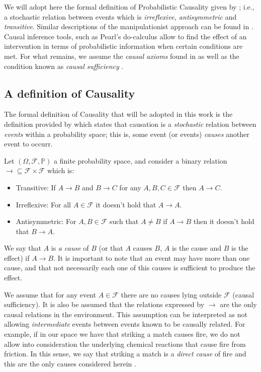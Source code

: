 \documentclass{svjour3}                     %
\begin{document}
We will adopt here the formal definition of Probabilistic Causality given by \cite{spirtes2000causation}; i.e., a stochastic relation between events which is \textit{irreflexive, antisymmetric} and \textit{transitive}. Similar descriptions of the manipulationist approach can be found in \cite{holland1986statistics}. Causal inference tools, such as Pearl's do-calculus \citep{pearl2009causality} allow to find the effect of an intervention in terms of probabilistic information when certain conditions are met. For what remains, we assume the \textit{causal axioms} found in \citep{spirtes2000causation} as well as the condition known as \textit{causal sufficiency} \citep{pearl2009causality}.

\subsection{A definition of Causality}
The formal definition of Causality that will be adopted in this work is the definition provided by \cite{spirtes2000causation} which states that causation is a \textit{stochastic} relation between \textit{events} within a probability space; this is, some event (or events) \textit{causes} another event to occurr.
\begin{definition}{\label{causal_relation}}
Let $(\Omega, \mathcal{F}, \mathbb{P})$ a finite probability space, and consider a binary relation $\to \subseteq \mathcal{F} \times \mathcal{F}$ which is:
\begin{itemize}
\item Transitive: If $A \to B$ and $B \to C$ for any $A, B, C \in \mathcal{F}$ then $A \to C$.
\item Irreflexive: For all $A \in \mathcal{F}$ it doesn't hold that $A \to A$.
\item Antisymmetric: For $A,B \in \mathcal{F}$ such that $A \neq B$ if $A \to B$ then it doesn't hold that $B \to A$.
\end{itemize}
We say that $A$ is \textit{a cause} of $B$ (or that $A$ causes $B$, $A$ is the cause and $B$ is the effect) if $A \to B$. It is important to note that an event may have more than one cause, and that not necessarily each one of this causes is sufficient to produce the effect. 
\end{definition}

We assume that for any event $A \in \mathcal{F}$ there are no causes lying outside $\mathcal{F}$ (causal sufficiency). It is also be assumed that the relations expressed by $\to$ are the only causal relations in the environment. This assumption can be interpreted as not allowing \textit{intermediate} events between events known to be causally related. For example, if in our space we have that striking a match causes fire, we do not allow into consideration the underlying chemical reactions that cause fire from friction. In this sense, we say that striking a match is a \textit{direct cause} of fire and this are the only causes considered herein \citep{spirtes2000causation}. 
\end{document}
